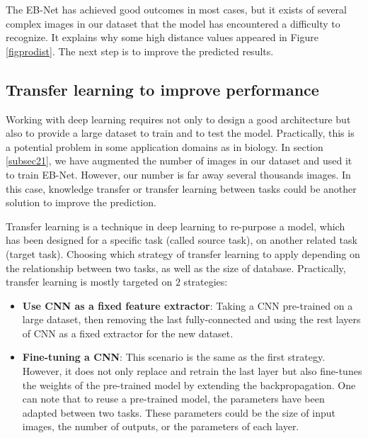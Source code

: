 \documentclass[review]{elsarticle}
\begin{document}
The EB-Net has achieved good outcomes in most cases, but it exists of several complex images in our dataset that the model has encountered a difficulty to recognize. It explains why some high distance values appeared in Figure \ref{figprodist}. The next step is to improve the predicted results.

\subsection{Transfer learning to improve performance}
Working with deep learning requires not only to design a good architecture but also to provide a large dataset to train and to test the model. Practically, this is a potential problem in some application domains as in biology. In section \ref{subsec21}, we have augmented the number of images in our dataset and used it to train EB-Net. However, our number is far away several thousands images. In this case, knowledge transfer or transfer learning between tasks could be another solution to improve the prediction. %

Transfer learning \cite{olivas2009handbook, yosinski2014transferable} is a technique in deep learning to re-purpose a model, which has been designed for a specific task (called source task), on another related task (target task). Choosing which strategy of transfer learning to apply depending on the relationship between two tasks, as well as the size of database. Practically, transfer learning is mostly targeted on $2$ strategies:
\begin{itemize}
	\item \textbf{Use CNN as a fixed feature extractor}: Taking a CNN pre-trained on a large dataset, then removing the last fully-connected and using the rest layers of CNN as a fixed extractor for the new dataset.
	\item \textbf{Fine-tuning a CNN}: This scenario is the same as the first strategy. However, it does not only replace and retrain the last layer but also fine-tunes the weights of the pre-trained model by extending the backpropagation. One can note that to reuse a pre-trained model, the parameters have been adapted between two tasks. These parameters could be the size of input images, the number of outputs, or the parameters of each layer.%
\end{itemize}
\end{document}
